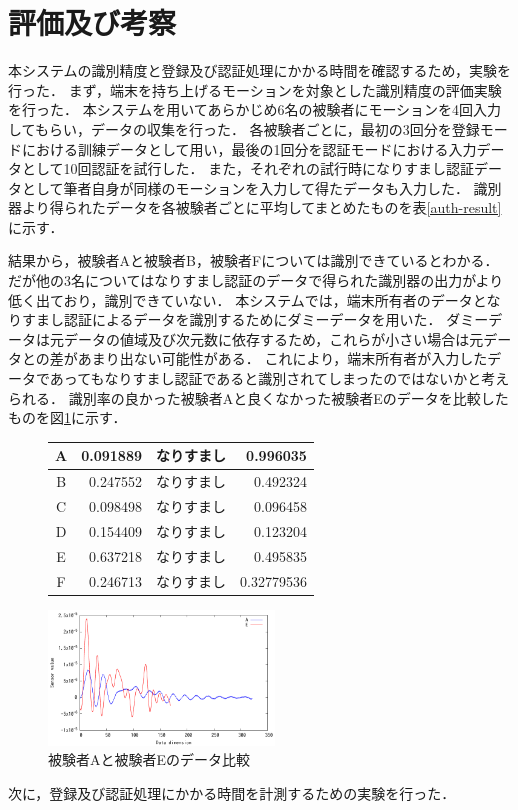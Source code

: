 \section{評価及び考察}
本システムの識別精度と登録及び認証処理にかかる時間を確認するため，実験を行った．
まず，端末を持ち上げるモーションを対象とした識別精度の評価実験を行った．
本システムを用いてあらかじめ6名の被験者にモーションを4回入力してもらい，データの収集を行った．
各被験者ごとに，最初の3回分を登録モードにおける訓練データとして用い，最後の1回分を認証モードにおける入力データとして10回認証を試行した．
また，それぞれの試行時になりすまし認証データとして筆者自身が同様のモーションを入力して得たデータも入力した．
識別器より得られたデータを各被験者ごとに平均してまとめたものを表\ref{auth-result}に示す．

結果から，被験者Aと被験者B，被験者Fについては識別できているとわかる．
だが他の3名についてはなりすまし認証のデータで得られた識別器の出力がより低く出ており，識別できていない．
本システムでは，端末所有者のデータとなりすまし認証によるデータを識別するためにダミーデータを用いた．
ダミーデータは元データの値域及び次元数に依存するため，これらが小さい場合は元データとの差があまり出ない可能性がある．
これにより，端末所有者が入力したデータであってもなりすまし認証であると識別されてしまったのではないかと考えられる．
識別率の良かった被験者Aと良くなかった被験者Eのデータを比較したものを図\ref{compare}に示す．

\begin{figure}[tbhp]
  \def\@captype{table}
  \begin{minipage}[t]{.48\textwidth}
    \centering
    \label{auth-result}
    \begin{tabular}{|c|r||c|r|} \hline
      A & 0.091889 & なりすまし & 0.996035 \\ \hline
      B & 0.247552 & なりすまし & 0.492324 \\ \hline
      C & 0.098498 & なりすまし & 0.096458 \\ \hline
      D & 0.154409 & なりすまし & 0.123204 \\ \hline
      E & 0.637218 & なりすまし & 0.495835 \\ \hline
      F & 0.246713 & なりすまし & 0.32779536 \\ \hline
    \end{tabular}
  \end{minipage}
  \hfill
  \begin{minipage}[c]{.48\textwidth}
    \centering
    \includegraphics[bb=0 0 360 216, width=6cm]{Graphs/comp.pdf}
    \caption{被験者Aと被験者Eのデータ比較}
    \label{compare}
  \end{minipage}
\end{figure}


次に，登録及び認証処理にかかる時間を計測するための実験を行った．
